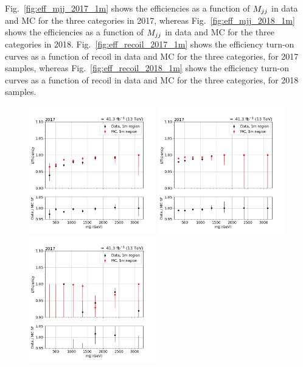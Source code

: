 Fig.~\ref{fig:eff_mjj_2017_1m} shows the efficiencies as a function of $M_{jj}$ in data and MC for the three categories in 2017, 
whereas Fig.~\ref{fig:eff_mjj_2018_1m} shows the efficiencies as a function of $M_{jj}$ in data and MC for the three categories in 2018. 
Fig.~\ref{fig:eff_recoil_2017_1m} shows the efficiency turn-on curves as a function of recoil in data and MC for the three categories, 
for 2017 samples, whereas Fig.~\ref{fig:eff_recoil_2018_1m} shows the efficiency turn-on curves as a function of recoil in data and MC 
for the three categories, for 2018 samples. 

\begin{figure}[htp]
    \begin{center}
        \includegraphics[width=0.49\textwidth]{fig/efficiency/trigger/met/mjj/data_mc_comparison_1m_2017_one_jet_forward_one_jet_central.png}
        \includegraphics[width=0.49\textwidth]{fig/efficiency/trigger/met/mjj/data_mc_comparison_1m_2017_two_central_jets.png} \\
        \includegraphics[width=0.49\textwidth]{fig/efficiency/trigger/met/mjj/data_mc_comparison_1m_2017_two_forward_jets.png}

\end{center}
\end{figure}
